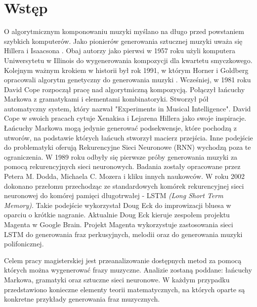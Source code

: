 \chapter*{Wstęp}


    O algorytmicznym komponowaniu muzyki myślano na długo przed powstaniem szybkich komputerów. Jako pionierów generowania sztucznej muzyki uważa się Hillera i Isaacsona . Obaj autorzy jako pierwsi w 1957 roku użyli komputera Uniwersytetu w Illinois do wygenerowania kompozycji dla kwartetu smyczkowego. Kolejnym ważnym krokiem w historii był rok 1991, w którym Horner i Goldberg opracowali algorytm genetyczny do generowania muzyki . Wcześniej, w 1981 roku David Cope rozpoczął pracę nad algorytmiczną kompozycją. Połączył łańcuchy Markowa z gramatykami i elementami kombinatoryki. Stworzył pół automatyczny system, który nazwał "Experiments in Musical Intelligence". David Cope w swoich pracach cytuje Xenakisa i Lejarena Hillera jako swoje inspiracje. Łańcuchy Markowa mogą jedynie generować podsekwensje, które pochodzą z utworów, na podstawie których łańcuch stworzył macierz przejścia. Inne podejście do problematyki oferują Rekurencyjne Sieci Neuronowe (RNN) wychodzą poza te ograniczenia. W 1989 roku odbyły się pierwsze próby generowania muzyki za pomocą rekurencyjnych sieci neuronowych. Badania zostały opracowane przez Petera M. Dodda, Michaela C. Mozera  i kliku innych naukowców. W roku 2002 dokonano przełomu przechodząc ze standardowych komórek rekurencyjnej sieci neuronowej do komórej pamięci długotrwałej - LSTM \textit{(Long Short Term Memory)}. Takie podejście wykorzystał Doug Eck do improwizacji bluesa w oparciu o krótkie nagranie. Aktualnie Doug Eck kieruje zespołem projektu Magenta w Google Brain. Projekt Magenta wykorzystuje zastosowania sieci LSTM do generowania fraz perkusyjnych, melodii oraz do generowania muzyki polifonicznej.   

	Celem pracy magisterskiej jest przeanalizowanie dostępnych metod za pomocą których można wygenerować frazy muzyczne. Analizie zostaną poddane: łańcuchy Markowa, gramatyki oraz sztuczne sieci neuronowe. W każdym przypadku przedstawiono konieczne elementy teorii matematycznych, na których oparte są konkretne przykłady generowania fraz muzycznych.
	
